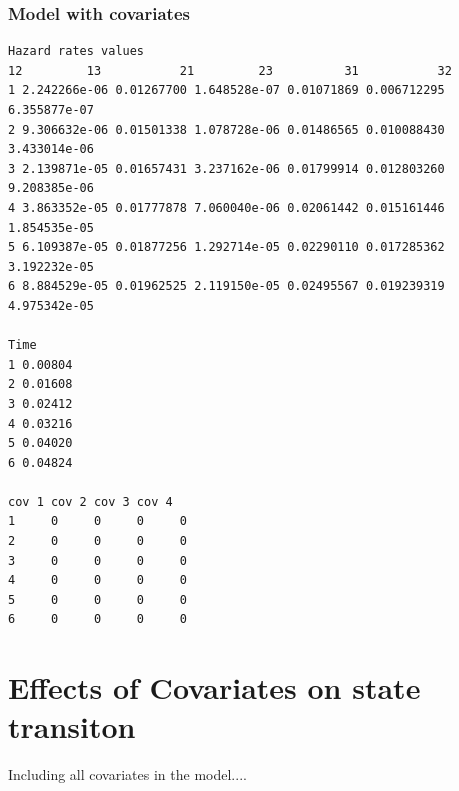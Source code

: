 \documentclass[11pt]{article}
\begin{document}
\subsubsection{Model with covariates}

\begin{verbatim}
Hazard rates values 
12         13           21         23          31           32
1 2.242266e-06 0.01267700 1.648528e-07 0.01071869 0.006712295 6.355877e-07
2 9.306632e-06 0.01501338 1.078728e-06 0.01486565 0.010088430 3.433014e-06
3 2.139871e-05 0.01657431 3.237162e-06 0.01799914 0.012803260 9.208385e-06
4 3.863352e-05 0.01777878 7.060040e-06 0.02061442 0.015161446 1.854535e-05
5 6.109387e-05 0.01877256 1.292714e-05 0.02290110 0.017285362 3.192232e-05
6 8.884529e-05 0.01962525 2.119150e-05 0.02495567 0.019239319 4.975342e-05

Time
1 0.00804
2 0.01608
3 0.02412
4 0.03216
5 0.04020
6 0.04824

cov 1 cov 2 cov 3 cov 4
1     0     0     0     0
2     0     0     0     0
3     0     0     0     0
4     0     0     0     0
5     0     0     0     0
6     0     0     0     0
\end{verbatim}


\section{Effects of Covariates on state transiton}

Including all covariates in the model....
\end{document}
